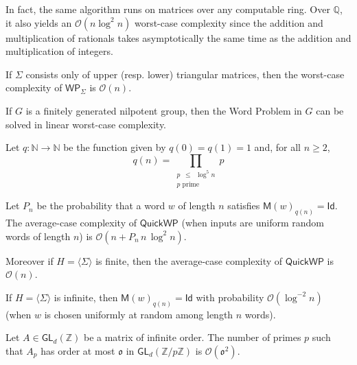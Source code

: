 \documentclass[10pt,a4paper]{amsart}
\def\GL{\textsf{GL}}
\def\Id{\textsf{Id}}
\def\N{\mathbb{N}}
\def\O{\mathcal{O}}
\def\Q{\mathbb{Q}}
\def\S{\textsf{QuickWP}}
\def\WP{\textsf{WP}}
\def\Z{\mathbb{Z}}
\def\mat{\textsf{M}}
\begin{document}
\begin{remark}\label{rk: worst case in other rings}
    In fact, the same algorithm runs on matrices over any computable ring. Over $\Q$, it also yields an $\O(n\log^2n)$ worst-case complexity since the addition and multiplication of rationals takes asymptotically the same time as the addition and multiplication of integers.
\end{remark}

\begin{proposition}\label{prop: upper triangular}
    If $\Sigma$ consists only of upper (resp. lower) triangular matrices, then the worst-case complexity of $\WP_\Sigma$ is $\O(n)$.

    If $G$ is a finitely generated nilpotent group, then the Word Problem in $G$ can be solved in linear worst-case complexity.
\end{proposition}

\begin{definition}\label{def: def of q}
    Let $q\colon \N\to\N$ be the function given by $q(0) = q(1) = 1$ and, for all $n\ge 2$,
\[
q(n) = \prod_{\substack{p \enspace \leq \enspace \log^5 n\\p\text{ prime}}} p
\]
\end{definition}

\begin{lemma}\label{lemma: ac of DCm}
%
Let $P_n$ be the probability that a word $w$ of length $n$ satisfies $\mat(w)_{q(n)} = \Id$. The aver\-age-case complexity of $\S$ (when inputs are uniform random words of length $n$) is $\O(n + P_n\, n\, \log^2n)$.

Moreover if $H = \langle\Sigma\rangle$ is finite, then the average-case complexity of $\S$ is $\O(n)$.
%
\end{lemma}

\begin{theorem}\label{thm: technical theorem}
    If $H = \langle\Sigma\rangle$ is infinite, then $\mat(w)_{q(n)} = \Id$ with probability $\O(\log^{-2} n)$ (when $w$ is chosen uniformly at random among length $n$ words).
\end{theorem}

\begin{lemma}\label{lm: matrices of small order}
Let $A\in\GL_d(\mathbb{Z})$ be a matrix of infinite order.  The number of primes $p$ such that $A_p$ has order at most $\mathfrak{o}$ in $\GL_d(\Z/p\Z)$ is $\O(\mathfrak{o}^2)$. 
\end{lemma}
\end{document}

